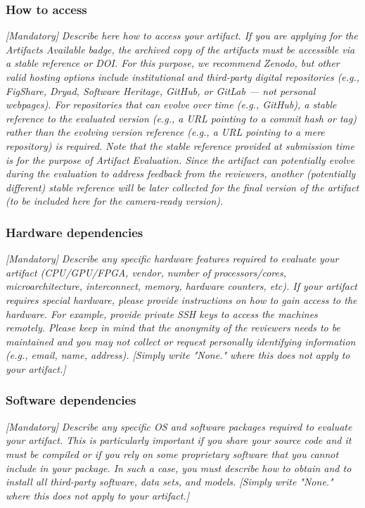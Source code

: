 \subsubsection{How to access}
{\em [Mandatory]} \textit{Describe here how to access your artifact. If you are
applying for the Artifacts Available badge, the archived copy of the artifacts
must be accessible via a stable reference or DOI. For this purpose, we recommend
Zenodo, but other valid hosting options include institutional and
third-party digital repositories (e.g., FigShare, Dryad, Software
Heritage, GitHub, or GitLab — not personal webpages). For repositories that can
evolve over time (e.g., GitHub), a stable reference to the evaluated version
(e.g., a URL pointing to a commit hash or tag) rather than the evolving version
reference (e.g., a URL pointing to a mere repository) is required. Note that the
stable reference provided at submission time is for the purpose of Artifact
Evaluation. Since the artifact can potentially evolve during the evaluation to
address feedback from the reviewers, another (potentially different) stable
reference will be later collected for the final version of the artifact (to be
included here for the camera-ready version).}


\subsubsection{Hardware dependencies}
{\em [Mandatory]} \textit{Describe any specific hardware features required to
evaluate your artifact (CPU/GPU/FPGA, vendor, number of processors/cores,
microarchitecture, interconnect, memory, hardware counters, etc). If your
artifact requires special hardware, please provide instructions on how to gain
access to the hardware. For example, provide private SSH keys to access the
machines remotely. Please keep in mind that the anonymity of the reviewers needs
to be maintained and you may not collect or request personally identifying
information (e.g., email, name, address). [Simply write "None." where this does
not apply to your artifact.]}

\subsubsection{Software dependencies}
{\em [Mandatory]} \textit{Describe any specific OS and software packages
required to evaluate your artifact. This is particularly important if you share
your source code and it must be compiled or if you rely on some proprietary
software that you cannot include in your package. In such a case, you must
describe how to obtain and to install all third-party software, data sets, and
models. [Simply write "None." where this does not apply to your artifact.]}

